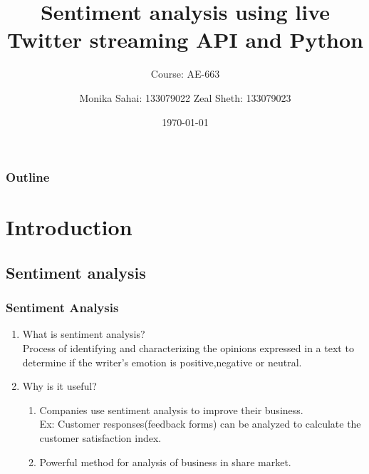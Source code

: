 \documentclass{beamer}
\begin{document}
\title{Sentiment analysis using live Twitter streaming API and Python}
\subtitle{Course: AE-663}
\author{Monika Sahai: 133079022
Zeal Sheth: 133079023}
\date{\today}

\begin{frame}
\titlepage
\end{frame}

\begin{frame}
\frametitle{Outline}
\tableofcontents
\end{frame}

\section{Introduction}

\subsection{Sentiment analysis}
\begin{frame}
\frametitle{Sentiment Analysis}
\begin{enumerate}
\item What is sentiment analysis?\\
Process of identifying and characterizing the opinions expressed in a text to determine if the writer's emotion is positive,negative or neutral.\\
\item Why is it useful?
\begin{enumerate}
\item Companies use sentiment analysis to improve their business.\\
Ex: Customer responses(feedback forms) can be analyzed to calculate the customer satisfaction index.
\item Powerful method for analysis of business in share market.
\end{enumerate}
\end{enumerate}
\end{frame}
\end{document}
